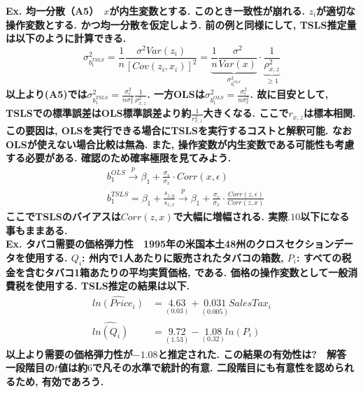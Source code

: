 \documentclass[paper=a4paper,fontsize=10pt]{jlreq}
\begin{document}
\rmfamily\mcfamily\bfseries{Ex. 均一分散（A5）}\mdseries　$x$が内生変数とする. このとき一致性が崩れる. $z_i$が適切な操作変数とする. かつ均一分散を仮定しよう. 前の例と同様にして, TSLS推定量は以下のように計算できる.
\begin{equation*}
  \sigma_{b_1^{TSLS}}^2 = \frac{1}{n}\frac{\sigma^2Var(z_i)}{[Cov(z_i, x_i)]^2} = \underset{\sigma_{b_1^{OLS}}^2}{\underbrace{\frac{1}{n}\frac{\sigma^2}{Var(x)}}} \cdot \underset{\geq 1}{\underbrace{\frac{1}{\rho_{x, z}^2}}}
\end{equation*}
以上より(A5)では$\sigma_{b_1^{TSLS}}^2 = \frac{\sigma_{\epsilon}^2}{n \sigma_{x}^2}\frac{1}{\rho_{x, z}^2}$. 一方OLSは$\sigma_{b_1^{OLS}}^2 = \frac{\sigma_{\epsilon}^2}{n \sigma_{x}^2}$. 故に目安として, TSLSでの標準誤差はOLS標準誤差より約$\frac{1}{r_{x, z}^2}$大きくなる. ここで$r_{x,z}$は標本相関. この要因は, OLSを実行できる場合に\rmfamily\mcfamily\bfseries{TSLSを実行するコスト}\mdseries と解釈可能. なおOLSが使えない場合比較は無為. また, 操作変数が内生変数である可能性も考慮する必要がある. 確認のため確率極限を見てみよう.
\begin{align*}
  &b_1^{OLS} \overset{p}{\to} \beta_1 + \frac{\sigma_{\epsilon}}{\sigma_{x}} \cdot Corr(x, \epsilon)\\
  &b_1^{TSLS} = \beta_1 + \frac{s_{z,y}}{s_{z,x}} \overset{p}{\to} \beta_1 + \frac{\sigma_{\epsilon}}{\sigma_{x}} \cdot \frac{Corr(z, \epsilon)}{Corr(z, x)}
\end{align*}
ここでTSLSのバイアスは$Corr(z, x)$で大幅に増幅される. 実際$.10$以下になる事もままある.\\

\rmfamily\mcfamily\bfseries{Ex. タバコ需要の価格弾力性}\mdseries　1995年の米国本土48州のクロスセクションデータを使用する. $Q_i$: 州内で1人あたりに販売されたタバコの箱数, $P_i$: すべての税金を含むタバコ1箱あたりの平均実質価格, である. 価格の操作変数として一般消費税を使用する. TSLS推定の結果は以下.
\begin{align*}
  \hat{ln(Price_i)} &= \underset{(0.03)}{4.63}  + \underset{(0.005)}{0.031}  SalesTax_i\\
  \hat{ln(Q_i)} &= \underset{(1.53)}{9.72} - \underset{(0.32)}{1.08}  ln(P_i)
\end{align*}
以上より需要の価格弾力性が$-1.08$と推定された. この結果の有効性は?　\rmfamily\mcfamily\bfseries{解答}\mdseries　一段階目の$t$値は約$6$で凡その水準で統計的有意. 二段階目にも有意性を認められるため, 有効であろう.\\
\end{document}
